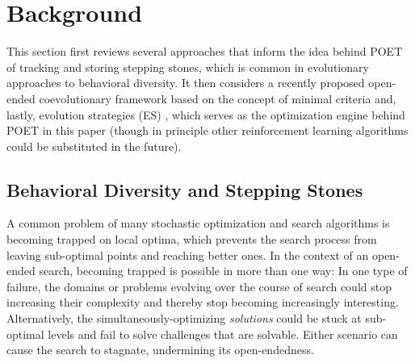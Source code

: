 \documentclass{article}
\newcommand{\todo}[1]{\comments{\textcolor{red}{[TODO: #1]}}}
\newcommand{\rw}[1]{\comments{\textcolor{blue}{[Rui: #1]}}}
\newcommand{\comments}[1]{#1}
\begin{document}

\section{Background} \label{prelim}

This section first reviews several approaches that inform the idea behind POET of tracking and storing stepping stones, which is common in evolutionary approaches to behavioral diversity. It then considers a recently proposed open-ended coevolutionary framework based on the concept of minimal criteria and, lastly, evolution strategies (ES) \cite{es}, %
which serves as the optimization engine behind POET in this paper (though in principle other reinforcement learning algorithms could be substituted in the future).  
\subsection{Behavioral Diversity and Stepping Stones}
\label{CMOEA overview}

A common problem of many stochastic optimization and search algorithms is becoming trapped on local optima, which prevents the search process from leaving sub-optimal points and reaching better ones. In the context of an open-ended search, becoming trapped is possible in more than one way: In one type of failure, the domains or problems evolving over the course of search could stop increasing their complexity and thereby stop becoming increasingly interesting.  Alternatively, the simultaneously-optimizing \emph{solutions} could be stuck at sub-optimal levels and fail to solve challenges that are solvable. Either scenario can cause the search to stagnate, undermining its open-endedness. 
\end{document}
